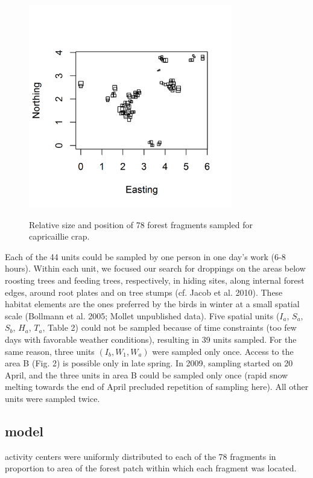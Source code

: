\begin{figure}
\centering
\includegraphics[width=3.5in,height=3.5in]{Ch5/figs/Cap-fragments.png}
\label{poisson-mn.fig.capfrags}
\caption{Relative size and position of 78 forest fragments sampled for
  capricaillie crap.}
\end{figure}


Each of the 44 units
could be sampled by one person in
one day's work (6-8 hours). Within each unit, we focused our search
for droppings on the areas below roosting trees and feeding trees,
respectively, in hiding sites, along internal forest edges, around
root plates and on tree stumps (cf. Jacob et al. 2010). These habitat
elements are the ones preferred by the birds in winter at a small
spatial scale (Bollmann et al. 2005; Mollet unpublished data).
Five spatial units ($I_a$, $S_a$, $S_b$, $H_a$, $T_a$, Table 2) could
not be sampled because of time constraints (too few days with
favorable weather conditions), resulting in 39 units sampled. For the
same reason, three units $(I_b, W_1, W_a)$ were sampled only
once. Access to the area B (Fig. 2) is possible only in late
spring. In 2009, sampling started on 20 April, and the three units in
area B could be sampled only once (rapid snow melting towards the end
of April precluded repetition of sampling here). All other units were
sampled twice.




\subsection{model}

activity centers were uniformly distributed to each of the 78
fragments in proportion to area of the forest patch within which each
fragment was located.


